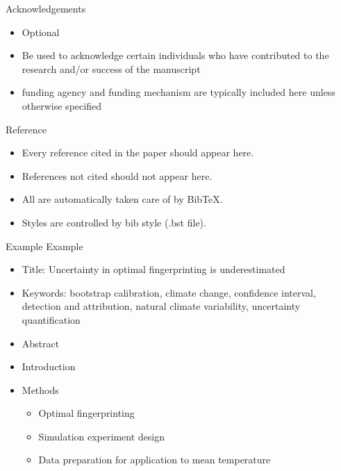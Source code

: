 \documentclass{beamer}
\begin{document}
    
    \begin{frame}{Acknowledgements}
    \begin{itemize}
        \item Optional
        \item Be used to acknowledge certain individuals who have contributed to the research and/or success of the manuscript
        \item funding agency and funding mechanism are typically included here unless otherwise specified
    \end{itemize}
    \end{frame}
    
    
    \begin{frame}{Reference}
    \begin{itemize}
        \item Every reference cited in the paper should appear here.
        \item References not cited should not appear here.
        \item All are automatically taken care of by BibTeX.
        \item Styles are controlled by bib style (.bst file).
    \end{itemize}
    \end{frame}
    
    
    \begin{frame}{Example}
    Example \citep{Li2021}
    \begin{itemize}
        \item Title: Uncertainty in optimal fingerprinting is underestimated
        \item Keywords: bootstrap calibration, climate change, confidence interval, detection and attribution, natural climate variability,
    uncertainty quantification
        \item Abstract
        \item Introduction
        \item Methods
        \begin{itemize}
            \item Optimal fingerprinting
            \item Simulation experiment design
            \item Data preparation for application to mean
    temperature
        \end{itemize}
    \end{itemize} 
    \end{frame}
    
\end{document}
